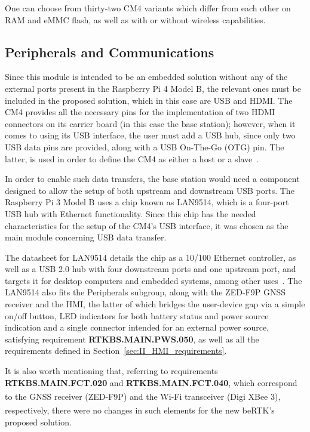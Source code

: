 One can choose from thirty-two CM4 variants which differ from each other on RAM and eMMC flash, as well as with or without wireless capabilities.

\subsection{Peripherals and Communications}\label{sec:312_Peripherals_Communications}

Since this module is intended to be an embedded solution without any of the external ports present in the Raspberry Pi 4 Model B, the relevant ones must be included in the proposed solution, which in this case are USB and HDMI. The CM4 provides all the necessary pins for the implementation of two HDMI connectors on its carrier board (in this case the base station); however, when it comes to using its USB interface, the user must add a USB hub, since only two USB data pins are provided, along with a USB On-The-Go (OTG) pin. The latter, is used in order to define the CM4 as either a host or a slave~\cite{CM4}.


In order to enable such data transfers, the base station would need a component designed to allow the setup of both upstream and downstream USB ports. The Raspberry Pi 3 Model B uses a chip known as LAN9514, which is a four-port USB hub with Ethernet functionality. Since this chip has the needed characteristics for the setup of the CM4's USB interface, it was chosen as the main module concerning USB data transfer.

The datasheet for LAN9514 details the chip as a 10/100 Ethernet controller, as well as a USB 2.0 hub with four downstream ports and one upstream port, and targets it for desktop computers and embedded systems, among other uses~\cite{LAN9514}. The LAN9514 also fits the Peripherals subgroup, along with the ZED-F9P GNSS receiver and the HMI, the latter of which bridges the user-device gap via a simple on/off button, LED indicators for both battery status and power source indication and a single connector intended for an external power source, satisfying requirement \textbf{RTKBS.MAIN.PWS.050}, as well as all the requirements defined in Section~\ref{sec:II_HMI_requirements}.

It is also worth mentioning that, referring to requirements \textbf{RTKBS.MAIN.FCT.020} and \textbf{RTKBS.MAIN.FCT.040}, which correspond to the GNSS receiver (ZED-F9P) and the Wi-Fi transceiver (Digi XBee\textsuperscript{\textregistered} 3), respectively, there were no changes in such elements for the new beRTK\textsuperscript{\textregistered}'s proposed solution.

